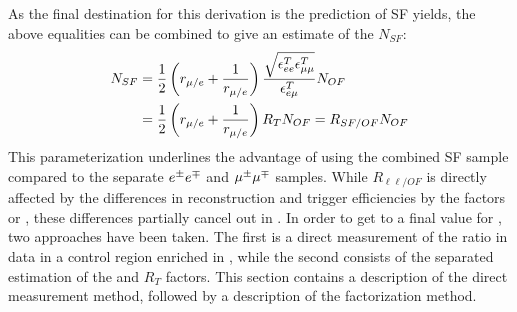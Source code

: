 As the final destination for this derivation is the prediction of SF yields, the above equalities can be combined to give an estimate of the $N_{SF}$:
\begin{align}
\label{eq:masterformulaExp}
    N_{SF} & = \frac{1}{2} \left( r_{\mu/e} + \frac{1}{r_{\mu/e}} \right) \frac{\sqrt{\epsilon^{T}_{ee}\epsilon^{T}_{\mu\mu}}}{\epsilon^{T}_{e\mu}} N_{OF}  \notag \\
           & = \frac{1}{2} \left( r_{\mu/e} + \frac{1}{r_{\mu/e}} \right) R_{T} N_{OF} = R_{SF/OF} N_{OF}
\end{align}                                                                                                                                                                  
This parameterization underlines the advantage of using the combined SF sample compared to the separate $e^{\pm}e^{\mp}$ and $\mu^{\pm}\mu^{\mp}$ samples.
While $R_{\ell\ell/OF}$ is directly affected by the differences in reconstruction and trigger efficiencies by the factors \rmue or \rmueinv, these differences partially cancel out in \Rsfof. 
In order to get to a final value for \Rsfof, two approaches have been taken. 
The first is a direct measurement of the ratio \Rsfof in data in a control region enriched in \ttbar, while the second consists of the separated estimation of the \rmue and $R_T$ factors.
This section contains a description of the direct measurement method, followed by a description of the factorization method. 
